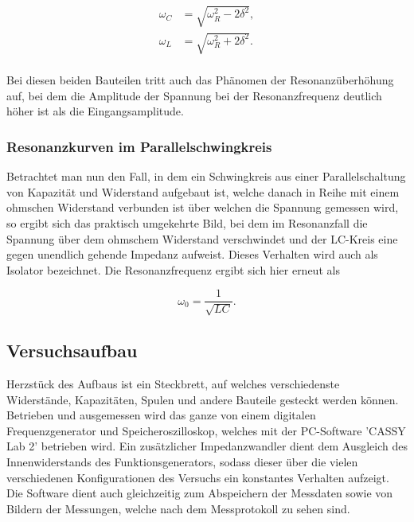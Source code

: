 \documentclass{article}
\begin{document}
\begin{equation}
    \begin{split}
        \omega_C &= \sqrt{\omega_R^2 - 2\delta^2}, \\
        \omega_L &= \sqrt{\omega_R^2 + 2\delta^2}. \\
    \end{split}
\end{equation}

Bei diesen beiden Bauteilen tritt auch das Phänomen der Resonanzüberhöhung auf, bei dem die Amplitude der Spannung bei der Resonanzfrequenz deutlich höher ist als die Eingangsamplitude. 


\subsubsection{Resonanzkurven im Parallelschwingkreis}

Betrachtet man nun den Fall, in dem ein Schwingkreis aus einer Parallelschaltung von Kapazität und Widerstand aufgebaut ist, welche danach in Reihe mit einem ohmschen Widerstand verbunden ist über welchen die Spannung gemessen wird, so ergibt sich das praktisch umgekehrte Bild, bei dem im Resonanzfall die Spannung über dem ohmschem Widerstand verschwindet und der LC-Kreis eine gegen unendlich gehende Impedanz aufweist. Dieses Verhalten wird auch als Isolator bezeichnet. Die Resonanzfrequenz ergibt sich hier erneut als

\begin{equation}
    \omega_0 = \frac{1}{\sqrt{LC}}.
\end{equation}

\newpage
\subsection{Versuchsaufbau}

Herzstück des Aufbaus ist ein Steckbrett, auf welches verschiedenste Widerstände, Kapazitäten, Spulen und andere Bauteile gesteckt werden können. Betrieben und ausgemessen wird das ganze von einem digitalen Frequenzgenerator und Speicheroszilloskop, welches mit der PC-Software 'CASSY Lab 2' betrieben wird. Ein zusätzlicher Impedanzwandler dient dem Ausgleich des Innenwiderstands des Funktionsgenerators, sodass dieser über die vielen verschiedenen Konfigurationen des Versuchs ein konstantes Verhalten aufzeigt. Die Software dient auch gleichzeitig zum Abspeichern der Messdaten sowie von Bildern der Messungen, welche nach dem Messprotokoll zu sehen sind. 
\end{document}
